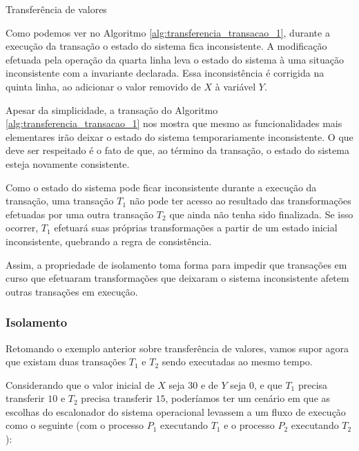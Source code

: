 \documentclass[11pt,twoside,a4paper]{book}
\begin{document}
\begin{algorithm}
\caption{Transferência de valores}
\label{alg:transferencia_transacao_1}
\end{algorithm}

Como podemos ver no Algoritmo \ref{alg:transferencia_transacao_1}, durante a execução da transação o estado do sistema fica inconsistente. A modificação efetuada pela operação da quarta linha leva o estado do sistema à uma situação inconsistente com a invariante declarada. Essa inconsistência é corrigida na quinta linha, ao adicionar o valor removido de $X$ à variável $Y$.

Apesar da simplicidade, a transação do Algoritmo \ref{alg:transferencia_transacao_1} nos mostra que mesmo as funcionalidades mais elementares irão deixar o estado do sistema temporariamente inconsistente. O que deve ser respeitado é o fato de que, ao término da transação, o estado do sistema esteja novamente consistente.

Como o estado do sistema pode ficar inconsistente durante a execução da transação, uma transação $T_1$ não pode ter acesso ao resultado das transformações efetuadas por uma outra transação $T_2$ que ainda não tenha sido finalizada. Se isso ocorrer, $T_1$ efetuará  suas próprias transformações a partir de um estado inicial inconsistente, quebrando a regra de consistência.

Assim, a propriedade de isolamento toma forma para impedir que transações em curso que efetuaram transformações que deixaram o sistema inconsistente afetem outras transações em execução. 

\subsubsection*{Isolamento}
Retomando o exemplo anterior sobre transferência de valores, vamos supor agora que existam duas transações $T_1$ e $T_2$ sendo executadas ao mesmo tempo.

Considerando que o valor inicial de $X$ seja 30 e de $Y$ seja 0, e que $T_1$ precisa transferir $10$ e $T_2$ precisa transferir $15$, poderíamos ter um cenário em que as escolhas do escalonador do sistema operacional levassem a um fluxo de execução como o seguinte (com o processo $P_1$ executando $T_1$ e o processo $P_2$ executando $T_2$):

\end{document}
